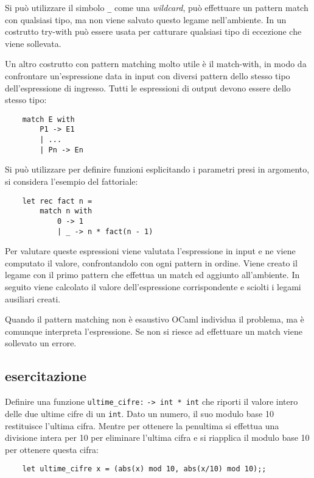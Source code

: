 \documentclass{article}
\numberwithin{equation}{subsection}
\begin{document}
Si può utilizzare il simbolo \verb|_| come una \textit{wildcard}, può effettuare un pattern match con qualsiasi tipo, ma non viene salvato questo legame nell'ambiente. In un costrutto try-with può essere usata per catturare qualsiasi tipo di eccezione che viene sollevata. 

Un altro costrutto con pattern matching molto utile è il match-with, in modo da confrontare un'espressione data in input con diversi pattern dello stesso tipo dell'espressione di ingresso. Tutti le espressioni di output devono essere dello stesso tipo:
\begin{verbatim}
    match E with
        P1 -> E1
        | ...
        | Pn -> En
\end{verbatim}

Si può utilizzare per definire funzioni esplicitando i parametri presi in argomento, si considera l'esempio del fattoriale:
\begin{verbatim}
    let rec fact n =
        match n with
            0 -> 1
            | _ -> n * fact(n - 1)
\end{verbatim}
Per valutare queste espressioni viene valutata l'espressione in input e ne viene computato il valore, confrontandolo con ogni pattern in ordine. Viene creato il legame con il primo pattern che effettua un match ed aggiunto all'ambiente. In seguito viene calcolato il valore dell'espressione corrispondente e sciolti i legami ausiliari creati. 

Quando il pattern matching non è esaustivo OCaml individua il problema, ma è comunque interpreta l'espressione. Se non si riesce ad effettuare un match viene sollevato un errore. 

\subsection*{esercitazione}

Definire una funzione \verb|ultime_cifre:| \verb|-> int * int| che riporti il valore intero delle due ultime cifre di un \verb|int|. Dato un numero, il suo modulo base 10 restituisce l'ultima cifra. Mentre per ottenere la penultima si effettua una divisione intera per 10 per eliminare l'ultima cifra e si riapplica il modulo base 10 per ottenere questa cifra:
\begin{verbatim}
    let ultime_cifre x = (abs(x) mod 10, abs(x/10) mod 10);;
\end{verbatim}

\end{document}
